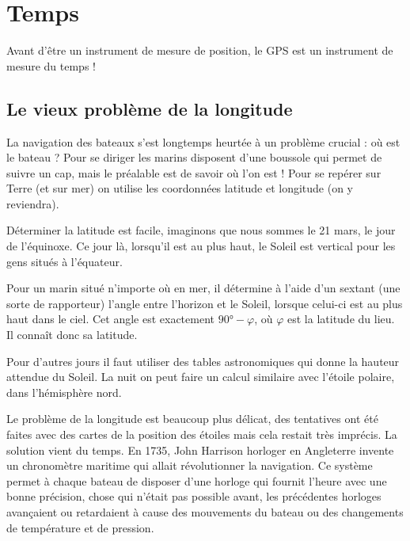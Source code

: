 \documentclass[class=report,crop=false]{standalone}
\begin{document}
\section{Temps}

Avant d'être un instrument de mesure de position, le GPS 
est un instrument de mesure du temps !


\subsection{Le vieux problème de la longitude}

La navigation des bateaux s'est longtemps heurtée à un problème crucial : 
où est le bateau ? Pour se diriger les marins disposent d'une boussole
qui permet de suivre un cap, mais le préalable est 
de savoir où l'on est ! Pour se repérer sur Terre (et sur mer) on utilise
les coordonnées latitude et longitude (on y reviendra).


Déterminer la latitude est facile, imaginons que nous sommes le 21 mars, le jour
de l'équinoxe. Ce jour là, lorsqu'il est au plus haut, 
le Soleil est vertical pour les gens situés à l'équateur.

Pour un marin situé n'importe où en mer, il détermine à l'aide d'un sextant 
(une sorte de rapporteur) l'angle entre l'horizon et le Soleil, 
lorsque celui-ci est au plus haut dans le ciel.
Cet angle est exactement $\ang{90} - \varphi$, où $\varphi$ est la latitude du lieu.
Il connaît donc sa latitude.


Pour d'autres jours il faut utiliser des tables astronomiques qui donne
la hauteur attendue du Soleil. La nuit on peut faire un calcul 
similaire avec l'étoile polaire, dans l'hémisphère nord.

\bigskip

Le problème de la longitude est beaucoup plus délicat, des tentatives ont été faites avec 
des cartes de la position des étoiles mais cela restait très imprécis. La solution
vient du temps.
En 1735, John Harrison horloger en Angleterre invente un chronomètre maritime 
qui allait révolutionner la navigation.
Ce système permet à chaque bateau de disposer d'une horloge qui fournit 
l'heure avec une bonne précision, chose qui n'était pas possible avant, les précédentes horloges 
avançaient ou retardaient à cause des mouvements du bateau ou des changements de température et de pression.
\end{document}

